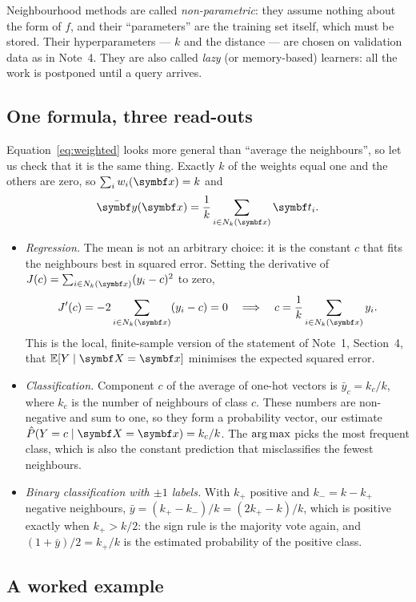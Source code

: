 \documentclass[11pt]{article}
\begin{document}
Neighbourhood methods are called \emph{non-parametric}: they assume nothing about the form of $f$, and their
``parameters'' are the training set itself, which must be stored. Their hyperparameters --- $k$ and the distance ---
are chosen on validation data as in Note~4. They are also called \emph{lazy} (or memory-based) learners: all the work
is postponed until a query arrives.

\subsection{One formula, three read-outs}\label{sec:oneformula}

Equation~\eqref{eq:weighted} looks more general than ``average the neighbours'', so let us check that it is the same
thing. Exactly $k$ of the weights equal one and the others are zero, so $\sum_i w_i(\x) = k$ and
\[
  \bar{\vect{y}}(\x) = \frac{1}{k} \sum_{i \in N_k(\x)} \vect{t}_i .
\]
\begin{itemize}
\item \emph{Regression.} The mean is not an arbitrary choice: it is the constant $c$ that fits the neighbours best in
squared error. Setting the derivative of $J(c) = \sum_{i \in N_k(\x)} (y_i - c)^2$ to zero,
\[
  J'(c) = -2 \sum_{i \in N_k(\x)} (y_i - c) = 0 \quad\Longrightarrow\quad c = \frac{1}{k}\sum_{i \in N_k(\x)} y_i .
\]
This is the local, finite-sample version of the statement of Note~1, Section~4, that $\E[Y \mid \X = \x]$ minimises
the expected squared error.
\item \emph{Classification.} Component $c$ of the average of one-hot vectors is $\bar y_c = k_c / k$, where $k_c$ is the
number of neighbours of class $c$. These numbers are non-negative and sum to one, so they form a probability vector,
our estimate $\hat P(Y = c \mid \X = \x) = k_c/k$. The $\operatorname*{arg\,max}$ picks the most frequent class, which is also the
constant prediction that misclassifies the fewest neighbours.
\item \emph{Binary classification with $\pm 1$ labels.} With $k_+$ positive and $k_- = k - k_+$ negative
neighbours, $\bar y = (k_+ - k_-)/k = (2k_+ - k)/k$, which is positive exactly when $k_+ > k/2$: the sign rule is the
majority vote again, and $(1 + \bar y)/2 = k_+/k$ is the estimated probability of the positive class.
\end{itemize}

\subsection{A worked example}\label{sec:toy}
\end{document}
